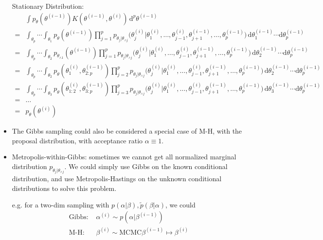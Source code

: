\begin{itemize}[topsep=2pt,itemsep=0pt]
    Stationary Distribution:
    \begin{align}
        &\int p_\theta (\theta ^{(i-1)})K(\theta ^{(i-1)},\theta ^{(i)}) \,\mathrm{d}^p\theta^{(i-1)}  \\
        = & \int_{\theta _p}\cdots \int_{\theta _1} p_{\theta }(\theta ^{(i-1)}) \prod_{j=1}^p p_{\theta _j|\theta _{\wedge j}}\big( \theta _j^{(i)} | \theta _1^{(i)},\ldots , \theta _{j-1}^{(i)},\theta _{j+1}^{(i-1)},\ldots, \theta _p^{(i-1)} \big) \,\mathrm{d}\theta _1^{(i-1)}\cdots \mathrm{d}\theta _p^{(i-1)} \\
        =&\int_{\theta _p}\cdots \int_{\theta _2}  p_{\theta _{\wedge 1}}(\theta ^{(i-1)}) \prod_{j=1}^p p_{\theta _j|\theta _{\wedge j}}\big( \theta _j^{(i)} | \theta _1^{(i)},\ldots , \theta _{j-1}^{(i)},\theta _{j+1}^{(i-1)},\ldots, \theta _p^{(i-1)} \big) \,\mathrm{d}\theta _2^{(i-1)}\cdots \mathrm{d}\theta _p^{(i-1)} \\
        =&\int_{\theta _p}\cdots \int_{\theta _2}  p_{\theta}(\theta^{(i)}_{1},\theta ^{(i-1)}_{2:p}) \prod_{j=2}^p p_{\theta _j|\theta _{\wedge j}}\big( \theta _j^{(i)} | \theta _1^{(i)},\ldots , \theta _{j-1}^{(i)},\theta _{j+1}^{(i-1)},\ldots, \theta _p^{(i-1)} \big) \,\mathrm{d}\theta _2^{(i-1)}\cdots \mathrm{d}\theta _p^{(i-1)} \\
        =&\int_{\theta _p}\cdots \int_{\theta _3}  p_{\theta}(\theta^{(i)}_{1:2},\theta ^{(i-1)}_{3:p}) \prod_{j=3}^p p_{\theta _j|\theta _{\wedge j}}\big( \theta _j^{(i)} | \theta _1^{(i)},\ldots , \theta _{j-1}^{(i)},\theta _{j+1}^{(i-1)},\ldots, \theta _p^{(i-1)} \big) \,\mathrm{d}\theta _3^{(i-1)}\cdots \mathrm{d}\theta _p^{(i-1)}\\
        =&\ldots\\
        =&p_{\theta}(\theta^{(i)})
    \end{align}
    
    
    
    
    
    \item The Gibbs sampling could also be considered a special case of M-H, with the proposal distribution, with acceptance ratio $ \alpha \equiv 1 $.
    
    \item Metropolis-within-Gibbs: sometimes we cannot get all normalized marginal distribution $ p_{\theta _j|\theta _{\wedge j}} $. We could simply use Gibbs on the known conditional distribution, and use Metropolis-Hastings on the unknown conditional distributions to solve this problem.
    
    e.g. for a two-dim sampling with $ p(\alpha |\beta ),\tilde{p}(\beta |\alpha ) $, we could
    \begin{align}
        \text{Gibbs: }&\alpha ^{(i)}\sim p(\alpha |\beta ^{(i-1)})\\
        \text{M-H: }&\beta ^{(i)}\sim \mathrm{MCMC}\beta ^{(i-1)}\mapsto \beta ^{(i)} 
    \end{align}
    
    
    
\end{itemize}

